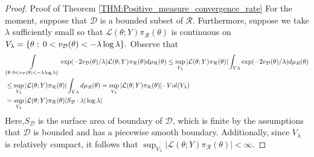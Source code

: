 \documentclass[10pt,fleqn]{article} \pdfoutput=1
\DeclareMathOperator{\1}{\mathbbm{1}} \DeclareMathOperator{\bigO}{\mc O}
\begin{document}
\begin{proof}{Proof of Theorem \ref{THM:Positive_measure_convergence_rate}}
	For the moment, suppose that $\mathcal{D}$ is a bounded subset of
	$\mathcal{R}$. Furthermore, suppose we take $\lambda$ sufficiently small so
	that $\mathcal{L}(\theta;Y)\pi_\mathcal{R}(\theta)$ is continuous on
	$V_\lambda = \{\theta: \,0 < v_{\mathcal{D}}(\theta)< -\lambda\log\lambda\}.$ Observe
	that  \begin{align*}  & \int\limits_{\{\theta: \, 0< v_{\mathcal{D}}(\theta)<
			-\lambda\log\lambda\}}\exp(-2v_{\mathcal{D}}(\theta)/\lambda
		)\mathcal{L}(\theta;Y)\pi_\mathcal{R}(\theta)
		d\mu_\mathcal{R}(\theta)  \le
		\sup_{V_\lambda}|\mathcal{L}(\theta;Y)\pi_\mathcal{R}(\theta)|
		\int_{V\lambda}\exp(-2v_{\mathcal{D}}(\theta)/\lambda ) d\mu_{R}(\theta) \\ &
		\le \sup_{V_\lambda}|\mathcal{L}(\theta;Y)\pi_\mathcal{R}(\theta)|
		\int_{V\lambda} d\mu_{R}(\theta)=
		\sup_{V_\lambda}|\mathcal{L}(\theta;Y)\pi_\mathcal{R}(\theta)|
		\cdot Vol(V_\lambda)                                         \\ &=
		\sup_{V_\lambda}|\mathcal{L}(\theta;Y)\pi_\mathcal{R}(\theta)|
		S_\mathcal{D} \cdot \lambda |\log \lambda|\end{align*}  Here,$
		S_\mathcal{D}$ is the surface area of boundary of $\mathcal{D}$, which is
	finite by the assumptions that $\mathcal{D}$ is bounded and has a piecewise
	smooth boundary. Additionally, since $V_\lambda$ is relatively compact, it
	follows that
	$\sup_{V_\lambda}|\mathcal{L}(\theta;Y)\pi_\mathcal{R}(\theta)| < \infty.$


\end{proof}
\end{document}
